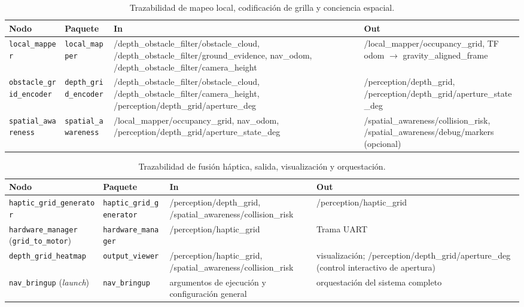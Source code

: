 \begin{table}[p]
    \centering
    \scriptsize
    \setlength{\extrarowheight}{2pt}
    \begin{tabularx}{\textwidth}{L{2.8cm}L{2.2cm}XX}
        \hline
        \textbf{Nodo} & \textbf{Paquete} & \textbf{In} & \textbf{Out} \\
        \hline
        \texttt{local\_mapper} & \texttt{local\_mapper} & /depth\_obstacle\_filter/obstacle\_cloud, /depth\_obstacle\_filter/ground\_evidence, nav\_odom, /depth\_obstacle\_filter/camera\_height & /local\_mapper/occupancy\_grid, TF odom $\to$ gravity\_aligned\_frame \\
        \addlinespace
        \texttt{obstacle\_grid\_encoder} & \texttt{depth\_grid\_encoder} & /depth\_obstacle\_filter/obstacle\_cloud, /depth\_obstacle\_filter/camera\_height, /perception/depth\_grid/aperture\_deg & /perception/depth\_grid, /perception/depth\_grid/aperture\_state\_deg \\
        \addlinespace
        \texttt{spatial\_awareness} & \texttt{spatial\_awareness} & /local\_mapper/occupancy\_grid, nav\_odom, /perception/depth\_grid/aperture\_state\_deg & /spatial\_awareness/collision\_risk, /spatial\_awareness/debug/markers (opcional) \\
        \hline
    \end{tabularx}
    \caption{Trazabilidad de mapeo local, codificación de grilla y conciencia espacial.}
    \label{tab:anexo-trazabilidad-mapeo}
\end{table}

\begin{table}[p]
    \centering
    \scriptsize
    \setlength{\extrarowheight}{2pt}
    \begin{tabularx}{\textwidth}{L{2.8cm}L{2.2cm}XX}
        \hline
        \textbf{Nodo} & \textbf{Paquete} & \textbf{In} & \textbf{Out} \\
        \hline
        \texttt{haptic\_grid\_generator} & \texttt{haptic\_grid\_generator} & /perception/depth\_grid, /spatial\_awareness/collision\_risk & /perception/haptic\_grid \\
        \addlinespace
        \texttt{hardware\_manager} (\texttt{grid\_to\_motor}) & \texttt{hardware\_manager} & /perception/haptic\_grid & Trama UART \\
        \addlinespace
        \texttt{depth\_grid\_heatmap} & \texttt{output\_viewer} & /perception/haptic\_grid, /spatial\_awareness/collision\_risk & visualización; /perception/depth\_grid/aperture\_deg (control interactivo de apertura) \\
        \addlinespace
        \texttt{nav\_bringup} (\emph{launch}) & \texttt{nav\_bringup} & argumentos de ejecución y configuración general & orquestación del sistema completo \\
        \hline
    \end{tabularx}
    \caption{Trazabilidad de fusión háptica, salida, visualización y orquestación.}
    \label{tab:anexo-trazabilidad-salida}
\end{table}


